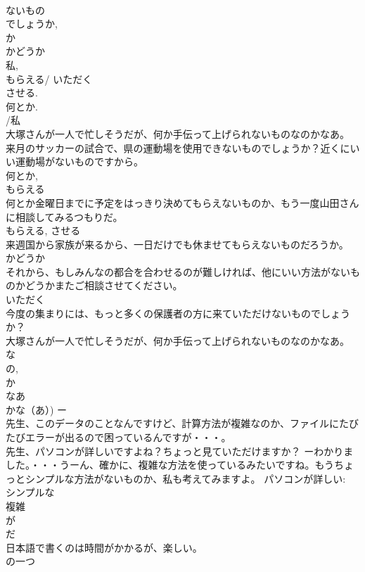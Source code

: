 \documentclass[8pt]{extreport}
\begin{document}
\begin{CJK}{UTF8}{min}
\\	ないもの 
\\	でしょうか, 
\\	か 
\\	かどうか 
\\	私, 
\\	もらえる/ いただく 
\\	させる. 
\\	何とか. 
\\	/私 
\\	大塚さんが一人で忙しそうだが、何か手伝って上げられないものなのかなあ。 
\\	来月のサッカーの試合で、県の運動場を使用できないものでしょうか？近くにいい運動場がないものですから。 
\\	何とか, 
\\	もらえる 
\\	何とか金曜日までに予定をはっきり決めてもらえないものか、もう一度山田さんに相談してみるつもりだ。 
\\	もらえる, させる 
\\	来週国から家族が来るから、一日だけでも休ませてもらえないものだろうか。 
\\	かどうか 
\\	それから、もしみんなの都合を合わせるのが難しければ、他にいい方法がないものかどうかまたご相談させてください。 
\\	いただく 
\\	今度の集まりには、もっと多くの保護者の方に来ていただけないものでしょうか？ 
\\	大塚さんが一人で忙しそうだが、何か手伝って上げられないものなのかなあ。 
\\	な 
\\	の, 
\\	か 
\\	なあ 
\\	かな（あ）) ー
\\	先生、このデータのことなんですけど、計算方法が複雑なのか、ファイルにたびたびエラーが出るので困っているんですが・・・。
\\	先生、パソコンが詳しいですよね？ちょっと見ていただけますか？ ーわかりました。・・・うーん、確かに、複雑な方法を使っているみたいですね。もうちょっとシンプルな方法がないものか、私も考えてみますよ。 パソコンが詳しい: 
\\	シンプルな 
\\	複雑
\\	が	
\\	だ 
\\	日本語で書くのは時間がかかるが、楽しい。
\\	の一つ	

\end{CJK}
\end{document}
